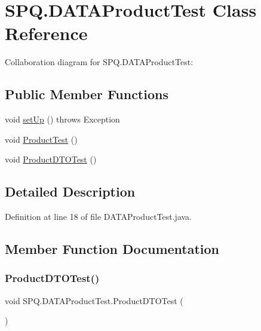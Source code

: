 \hypertarget{class_s_p_q_1_1_d_a_t_a_product_test}{}\section{S\+P\+Q.\+D\+A\+T\+A\+Product\+Test Class Reference}
\label{class_s_p_q_1_1_d_a_t_a_product_test}


Collaboration diagram for S\+P\+Q.\+D\+A\+T\+A\+Product\+Test\+:
\subsection*{Public Member Functions}
\begin{DoxyCompactItemize}
\item 
void \mbox{\hyperlink{class_s_p_q_1_1_d_a_t_a_product_test_a64e9238fb4b99af0cdf55768230b4c89}{set\+Up}} ()  throws Exception 
\item 
void \mbox{\hyperlink{class_s_p_q_1_1_d_a_t_a_product_test_afb49da7389a7f4f42159adf87b4a11be}{Product\+Test}} ()
\item 
void \mbox{\hyperlink{class_s_p_q_1_1_d_a_t_a_product_test_a572f5f092c734feea3c7d8767b4a86c5}{Product\+D\+T\+O\+Test}} ()
\end{DoxyCompactItemize}


\subsection{Detailed Description}


Definition at line 18 of file D\+A\+T\+A\+Product\+Test.\+java.



\subsection{Member Function Documentation}
\mbox{\label{class_s_p_q_1_1_d_a_t_a_product_test_a572f5f092c734feea3c7d8767b4a86c5}} 
\subsubsection{\texorpdfstring{Product\+D\+T\+O\+Test()}{ProductDTOTest()}}
{\footnotesize\ttfamily void S\+P\+Q.\+D\+A\+T\+A\+Product\+Test.\+Product\+D\+T\+O\+Test (\begin{DoxyParamCaption}{ }\end{DoxyParamCaption})}



